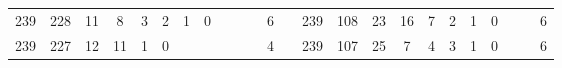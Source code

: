 {\begin{tabular}{cccccccccccclccccccccccc}
239                                                & 228                                                & 11                                               & 8                                                & 3                                                & 2                                                & 1                                               & 0                                               &                                                 &                                                 &                                                 & 6                                                &                          & 239                                                & 108                                                & 23                                               & 16                                               & 7                                               & 2                                               & 1                                               & 0                                               &                                                 &                                                 & 6                                                \\
239                                                & 227                                                & 12                                               & 11                                               & 1                                                & 0                                                &                                                 &                                                 &                                                 &                                                 &                                                 & 4                                                &                          & 239                                                & 107                                                & 25                                               & 7                                                & 4                                               & 3                                               & 1                                               & 0                                               &                                                 &                                                 & 6                                                \\

\end{tabular}}
